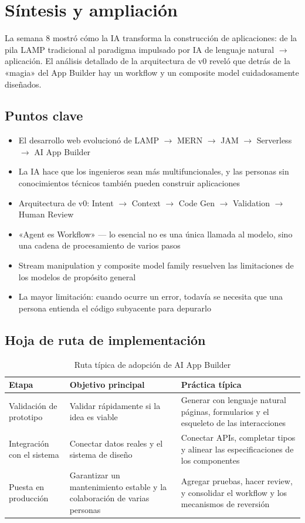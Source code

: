 \section{Síntesis y ampliación}

La semana 8 mostró cómo la IA transforma la construcción de aplicaciones: de la pila LAMP tradicional al paradigma impulsado por IA de lenguaje natural $\rightarrow$ aplicación. El análisis detallado de la arquitectura de v0 reveló que detrás de la «magia» del App Builder hay un workflow y un composite model cuidadosamente diseñados.

\subsection{Puntos clave}

\begin{itemize}
    \item El desarrollo web evolucionó de LAMP $\rightarrow$ MERN $\rightarrow$ JAM $\rightarrow$ Serverless $\rightarrow$ AI App Builder
    \item La IA hace que los ingenieros sean más multifuncionales, y las personas sin conocimientos técnicos también pueden construir aplicaciones
    \item Arquitectura de v0: Intent $\rightarrow$ Context $\rightarrow$ Code Gen $\rightarrow$ Validation $\rightarrow$ Human Review
    \item «Agent es Workflow» — lo esencial no es una única llamada al modelo, sino una cadena de procesamiento de varios pasos
    \item Stream manipulation y composite model family resuelven las limitaciones de los modelos de propósito general
    \item La mayor limitación: cuando ocurre un error, todavía se necesita que una persona entienda el código subyacente para depurarlo
\end{itemize}

\subsection{Hoja de ruta de implementación}

\begin{table}[H]
\centering
\begin{tabular}{p{} p{} p{}}
\toprule
Etapa & Objetivo principal & Práctica típica \\
\midrule
Validación de prototipo & Validar rápidamente si la idea es viable & Generar con lenguaje natural páginas, formularios y el esqueleto de las interacciones \\
Integración con el sistema & Conectar datos reales y el sistema de diseño & Conectar APIs, completar tipos y alinear las especificaciones de los componentes \\
Puesta en producción & Garantizar un mantenimiento estable y la colaboración de varias personas & Agregar pruebas, hacer review, y consolidar el workflow y los mecanismos de reversión \\
\bottomrule
\end{tabular}
\caption{Ruta típica de adopción de AI App Builder}
\end{table}

